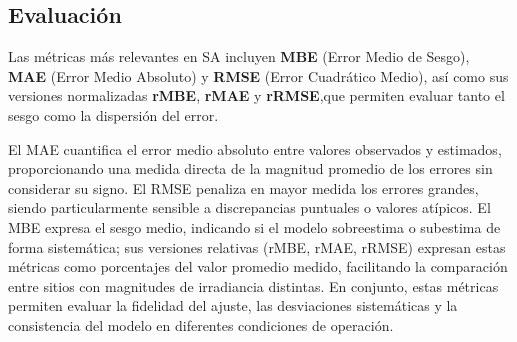 \documentclass[letterpaper,12pt, twoside]{report}
\providecommand{\DIFdeltex}[1]{{\protect\color{red} \scriptsize #1}} %
\providecommand{\DIFdel}[1]{\texorpdfstring{\DIFdeltex{#1}}{}} %
\begin{document}

\subsection*{\DIFdel{Evaluación}}

\DIFdel{Las métricas más relevantes en SA incluyen \textbf{MBE} (Error Medio de Sesgo), 
\textbf{MAE} (Error Medio Absoluto) y \textbf{RMSE} (Error Cuadrático Medio), 
así como sus versiones normalizadas \textbf{rMBE}, \textbf{rMAE} y \textbf{rRMSE},que permiten evaluar tanto el sesgo como la dispersión del error.
}%

\DIFdel{El MAE cuantifica el error medio absoluto entre valores observados y estimados, 
proporcionando una medida directa de la magnitud promedio de los errores sin considerar su signo. El RMSE penaliza en mayor medida los errores grandes, siendo particularmente sensible a discrepancias puntuales o valores atípicos. El MBE expresa el sesgo medio, indicando si el modelo sobreestima o subestima de forma sistemática; sus versiones relativas (rMBE, rMAE, rRMSE) expresan estas métricas como porcentajes del valor promedio medido, facilitando la comparación entre sitios con magnitudes de irradiancia distintas. En conjunto, estas métricas permiten evaluar la fidelidad del ajuste, las desviaciones sistemáticas y la consistencia del modelo en diferentes condiciones de operación.
}%
\end{document}
